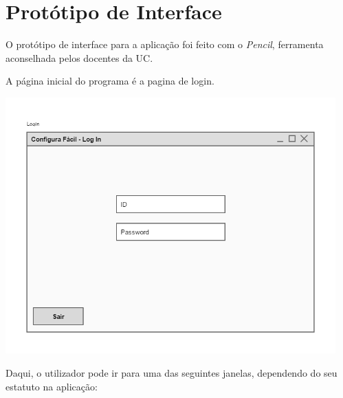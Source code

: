\section{Protótipo de Interface}
O protótipo de interface para a aplicação foi feito com o \textit{Pencil}, ferramenta aconselhada pelos docentes da UC.

A página inicial do programa é a pagina de login.
\begin{center}
 	\includegraphics[width = 5in]{Prototipagem/configura_fcil_root.png}
\end{center}

Daqui, o utilizador pode ir para uma das seguintes janelas, dependendo do seu estatuto na aplicação:

